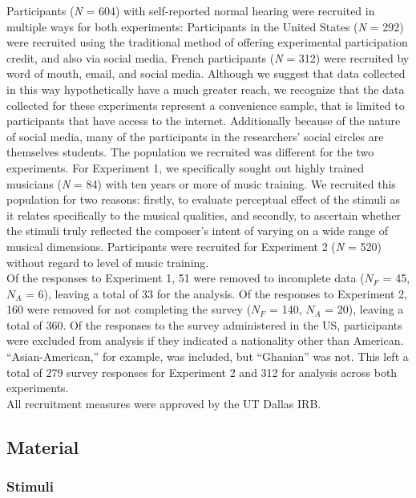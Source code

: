 \documentclass[
  english,
  man,floatsintext]{apa6}
\begin{document}
Participants (\emph{N} = 604) with self-reported normal hearing were recruited in multiple ways for both experiments: Participants in the United States (\emph{N} = 292) were recruited using the traditional method of offering experimental participation credit, and also via social media. French participants (\emph{N} = 312) were recruited by word of mouth, email, and social media. Although we suggest that data collected in this way hypothetically have a much greater reach, we recognize that the data collected for these experiments represent a convenience sample, that is limited to participants that have access to the internet. Additionally because of the nature of social media, many of the participants in the researchers' social circles are themselves students.
The population we recruited was different for the two experiments. For Experiment 1, we specifically sought out highly trained musicians (\emph{N} = 84) with ten years or more of music training. We recruited this population for two reasons: firstly, to evaluate perceptual effect of the stimuli as it relates specifically to the musical qualities, and secondly, to ascertain whether the stimuli truly reflected the composer's intent of varying on a wide range of musical dimensions. Participants were recruited for Experiment 2 (\emph{N} = 520) without regard to level of music training.\\
Of the responses to Experiment 1, 51 were removed to incomplete data (\(\textit{N}_F\) = 45, \(\textit{N}_A\) = 6), leaving a total of 33 for the analysis. Of the responses to Experiment 2, 160 were removed for not completing the survey (\(\textit{N}_F\) = 140, \(\textit{N}_A\) = 20), leaving a total of 360. Of the responses to the survey administered in the US, participants were excluded from analysis if they indicated a nationality other than American. ``Asian-American,'' for example, was included, but ``Ghanian'' was not. This left a total of 279 survey responses for Experiment 2 and 312 for analysis across both experiments.\\
All recruitment measures were approved by the UT Dallas IRB.

\hypertarget{material}{%
\subsection{Material}\label{material}}

\hypertarget{stimuli}{%
\subsubsection{Stimuli}\label{stimuli}}
\end{document}
